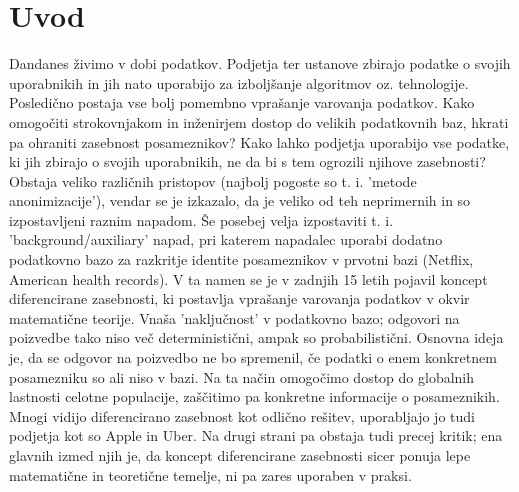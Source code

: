 \documentclass[12pt,a4paper]{amsart}
\theoremstyle{definition} %
\theoremstyle{plain} %
\begin{document}
\section{Uvod}
Dandanes živimo v dobi podatkov. Podjetja ter ustanove zbirajo podatke o svojih uporabnikih in jih nato uporabijo za izboljšanje algoritmov oz. tehnologije. Posledično postaja vse bolj pomembno  vprašanje  varovanja podatkov. Kako omogočiti strokovnjakom in inženirjem dostop do velikih podatkovnih baz, hkrati pa ohraniti zasebnost posameznikov? Kako lahko podjetja uporabijo vse podatke, ki jih zbirajo o svojih uporabnikih, ne da bi s tem ogrozili njihove zasebnosti? Obstaja veliko različnih pristopov (najbolj pogoste so t. i. 'metode anonimizacije'), vendar se je izkazalo, da je veliko od teh neprimernih in so izpostavljeni raznim napadom. Še posebej velja izpostaviti t. i. 'background/auxiliary' napad, pri katerem napadalec uporabi dodatno podatkovno bazo za razkritje identite posameznikov v prvotni bazi (Netflix, American health records).  V ta namen se je v zadnjih 15 letih pojavil koncept diferencirane zasebnosti, ki postavlja vprašanje varovanja podatkov v okvir matematične teorije. Vnaša 'naključnost' v podatkovno bazo; odgovori na poizvedbe tako niso več deterministični, ampak so probabilistični. Osnovna ideja je, da se odgovor na poizvedbo ne bo spremenil, če podatki o enem konkretnem posamezniku so ali niso v bazi. Na ta način omogočimo dostop do globalnih lastnosti celotne populacije, zaščitimo pa konkretne informacije o posameznikih. Mnogi vidijo diferencirano zasebnost kot odlično rešitev, uporabljajo jo tudi podjetja kot so Apple in Uber. Na drugi strani pa obstaja tudi precej kritik; ena glavnih izmed njih je, da koncept diferencirane zasebnosti sicer ponuja lepe matematične in teoretične temelje, ni pa zares uporaben v praksi. 
\newline
\newline
\end{document}
